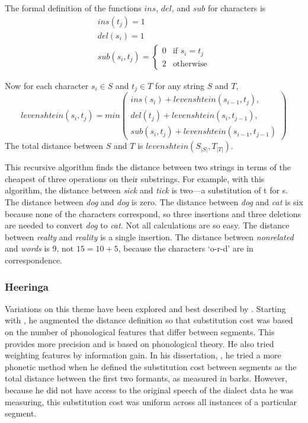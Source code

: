 \documentclass[11pt]{article}
\begin{document}
The formal definition of the functions $ins$, $del$, and $sub$
for characters is
\begin{equation}
\begin{array}{l}
   ins(t_j) = 1 \\
   del(s_i) = 1 \\
   sub(s_i,t_j) = \left\{
     \begin{array}{ll}
       0 & \textrm{if $s_i=t_j$} \\
       2 & \textrm{otherwise}
     \end{array} \right.

   \end{array}
\end{equation}

Now for each character $s_i \in S$ and $t_j \in T$ for any string $S$ and $T$,
\begin{equation}
  levenshtein(s_i,t_j) = min \left(
  \begin{array}{l}
   ins(s_i)+levenshtein(s_{i-1},t_j), \\
 del(t_j)+levenshtein(s_i,t_{j-1}), \\
 sub(s_i,t_j)+levenshtein(s_{i-1},t_{j-1})
   \end{array} \right)
   \label{levequation}
\end{equation}
The total distance between $S$ and $T$ is $levenshtein(S_{|S|},T_{|T|})$.

This recursive algorithm finds the distance between two strings in
terms of the cheapest of three operations on their substrings.
For example, with this algorithm, the distance between \textit{sick} and
\textit{tick} is two---a substitution of t for s. The distance between
\textit{dog} and \textit{dog} is zero. The distance between
\textit{dog} and \textit{cat} is six because none of the characters
correspond, so three insertions and three deletions are needed to
convert \textit{dog} to \textit{cat}. Not all calculations are so
easy. The distance between \textit{realty} and \textit{reality} is a
single insertion. The distance between \textit{nonrelated} and
\textit{words} is 9, not $15 =10 + 5$, because the characters `o-r-d'
are in correspondence.

\subsubsection{Heeringa}
\label{levmethod}
Variations on this theme have been explored and best described by
. Starting with \cite{nerbonne97}, he augmented
the distance definition so that substitution cost was based on the
number of phonological features that differ between segments. This provides more
precision and is based on phonological theory. He also tried
weighting features by information gain.  In his dissertation,
\cite{heeringa04}, he tried a more phonetic method when he defined the
substitution cost between segments as the total distance between the
first two formants, as measured in barks. However, because he did not
have access to the original speech of the dialect data he was
measuring, this substitution cost was uniform across all instances of
a particular segment.
\end{document}
